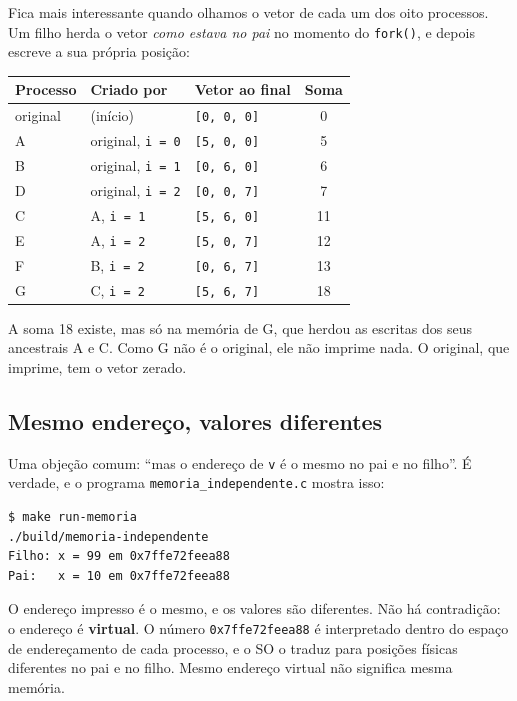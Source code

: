 \documentclass[11pt,a4paper]{article}
\newcommand{\raiz}{../../../..}
\newcommand{\cmd}[1]{\texttt{#1}}
\begin{document}
Fica mais interessante quando olhamos o vetor de cada um dos oito processos. Um filho herda o vetor \emph{como estava no pai} no momento do \cmd{fork()}, e depois escreve a sua própria posição:

\begin{center}
\begin{tabular}{@{}lllc@{}}
\toprule
\textbf{Processo} & \textbf{Criado por} & \textbf{Vetor ao final} & \textbf{Soma} \\
\midrule
original & (início) & \cmd{[0, 0, 0]} & 0 \\
A & original, \cmd{i = 0} & \cmd{[5, 0, 0]} & 5 \\
B & original, \cmd{i = 1} & \cmd{[0, 6, 0]} & 6 \\
D & original, \cmd{i = 2} & \cmd{[0, 0, 7]} & 7 \\
C & A, \cmd{i = 1} & \cmd{[5, 6, 0]} & 11 \\
E & A, \cmd{i = 2} & \cmd{[5, 0, 7]} & 12 \\
F & B, \cmd{i = 2} & \cmd{[0, 6, 7]} & 13 \\
G & C, \cmd{i = 2} & \cmd{[5, 6, 7]} & 18 \\
\bottomrule
\end{tabular}
\end{center}

A soma 18 existe, mas só na memória de G, que herdou as escritas dos seus ancestrais A e C. Como G não é o original, ele não imprime nada. O original, que imprime, tem o vetor zerado.

\subsection{Mesmo endereço, valores diferentes}

Uma objeção comum: ``mas o endereço de \cmd{v} é o mesmo no pai e no filho''. É verdade, e o programa \cmd{memoria\_independente.c} mostra isso:



\begin{lstlisting}[style=terminal]
$ make run-memoria
./build/memoria-independente
Filho: x = 99 em 0x7ffe72feea88
Pai:   x = 10 em 0x7ffe72feea88
\end{lstlisting}

O endereço impresso é o mesmo, e os valores são diferentes. Não há contradição: o endereço é \textbf{virtual}. O número \cmd{0x7ffe72feea88} é interpretado dentro do espaço de endereçamento de cada processo, e o SO o traduz para posições físicas diferentes no pai e no filho. Mesmo endereço virtual não significa mesma memória.
\end{document}
